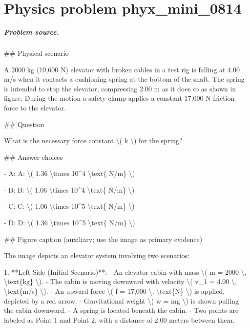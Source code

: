 
\chapter{Physics problem phyx\_mini\_0814}
\label{ch:PhyXMiniProblems_problem_phyx_mini_0814}

\paragraph{Problem source.}
\#\# Physical scenario

A 2000 kg (19,600 N) elevator with broken cables in a test rig is falling at 4.00 m/s when it contacts a cushioning spring at the bottom of the shaft. The spring is intended to stop the elevator, compressing 2.00 m as it does so as shown in figure. During the motion a safety clamp applies a constant 17,000 N friction force to the elevator.

\#\# Question

What is the necessary force constant \textbackslash{}( k \textbackslash{}) for the spring?

\#\# Answer choices

- A: A: \textbackslash{}( 1.36 \textbackslash{}times 10\textasciicircum{}4 \textbackslash{}text\{ N/m\} \textbackslash{})

- B: B: \textbackslash{}( 1.06 \textbackslash{}times 10\textasciicircum{}4 \textbackslash{}text\{ N/m\} \textbackslash{})

- C: C: \textbackslash{}( 1.06 \textbackslash{}times 10\textasciicircum{}5 \textbackslash{}text\{ N/m\} \textbackslash{})

- D: D: \textbackslash{}( 1.36 \textbackslash{}times 10\textasciicircum{}5 \textbackslash{}text\{ N/m\} \textbackslash{})

\#\# Figure caption (auxiliary; use the image as primary evidence)

The image depicts an elevator system involving two scenarios:

1. **Left Side (Initial Scenario)**:
   - An elevator cabin with mass \textbackslash{}( m = 2000 \textbackslash{}, \textbackslash{}text\{kg\} \textbackslash{}).
   - The cabin is moving downward with velocity \textbackslash{}( v\_1 = 4.00 \textbackslash{}, \textbackslash{}text\{m/s\} \textbackslash{}).
   - An upward force \textbackslash{}( f = 17,000 \textbackslash{}, \textbackslash{}text\{N\} \textbackslash{}) is applied, depicted by a red arrow.
   - Gravitational weight \textbackslash{}( w = mg \textbackslash{}) is shown pulling the cabin downward.
   - A spring is located beneath the cabin.
   - Two points are labeled as Point 1 and Point 2, with a distance of 2.00 meters between them.

